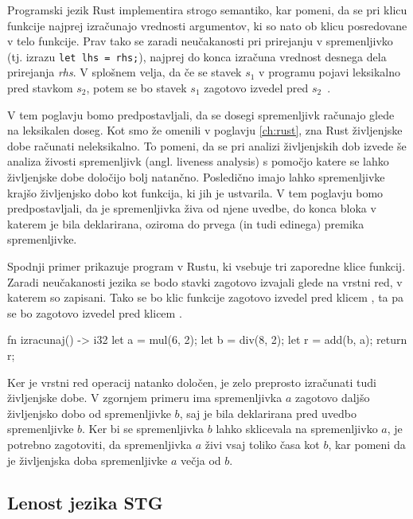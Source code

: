 Programski jezik Rust implementira strogo semantiko, kar pomeni, da se pri klicu funkcije najprej izračunajo vrednosti argumentov, ki so nato ob klicu posredovane v telo funkcije. Prav tako se zaradi neučakanosti pri prirejanju v spremenljivko (tj. izrazu \texttt{let lhs = rhs;}), najprej do konca izračuna vrednost desnega dela prirejanja \textit{rhs}. V splošnem velja, da če se stavek $s_1$ v programu pojavi leksikalno pred stavkom $s_2$, potem se bo stavek $s_1$ zagotovo izvedel pred $s_2$~.

V tem poglavju bomo predpostavljali, da se dosegi spremenljivk računajo glede na leksikalen doseg. Kot smo že omenili v poglavju \ref{ch:rust}, zna Rust življenjske dobe računati neleksikalno. To pomeni, da se pri analizi živ\-ljenj\-skih dob izvede še analiza živosti spremenljivk (angl. liveness analysis) s pomočjo katere se lahko življenjske dobe določijo bolj natančno. Posledično imajo lahko spremenljivke krajšo življenjsko dobo kot funkcija, ki jih je ustvarila. V tem poglavju bomo predpostavljali, da je spremenljivka živa od njene uvedbe, do konca bloka v katerem je bila deklarirana, oziroma do prvega (in tudi edinega) premika spremenljivke.

Spodnji primer prikazuje program v Rustu, ki vsebuje tri zaporedne klice funkcij. Zaradi neučakanosti jezika se bodo stavki zagotovo izvajali glede na vrstni red, v katerem so zapisani. Tako se bo klic funkcije  zagotovo izvedel pred klicem , ta pa se bo zagotovo izvedel pred klicem .

\begin{rust-success}
fn izracunaj() -> i32 {
    let a = mul(6, 2);
    let b = div(8, 2);
    let r = add(b, a);
    return r;
}
\end{rust-success}



Ker je vrstni red operacij natanko določen, je zelo preprosto izračunati tudi življenjske dobe. V zgornjem primeru ima spremenljivka $a$ zagotovo daljšo življenjsko dobo od spremenljivke $b$, saj je bila deklarirana pred uvedbo spremenljivke $b$. Ker bi se spremenljivka $b$ lahko sklicevala na spremenljivko $a$, je potrebno zagotoviti, da spremenljivka $a$ živi vsaj toliko časa kot $b$, kar pomeni da je življenjska doba spremenljivke $a$ večja od $b$.

\subsection{Lenost jezika STG}

